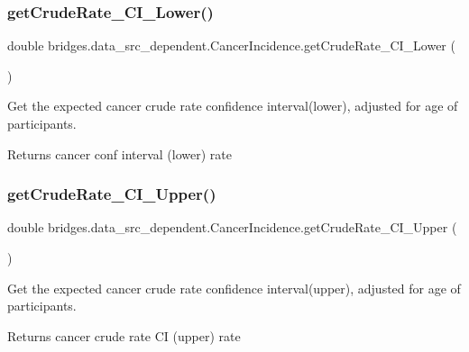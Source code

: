 \subsubsection{\texorpdfstring{getCrudeRate\_CI\_Lower()}{getCrudeRate\_CI\_Lower()}}
{\footnotesize\ttfamily double bridges.\+data\+\_\+src\+\_\+dependent.\+Cancer\+Incidence.\+get\+Crude\+Rate\+\_\+\+C\+I\+\_\+\+Lower (\begin{DoxyParamCaption}{ }\end{DoxyParamCaption})}



Get the expected cancer crude rate confidence interval(lower), adjusted for age of participants. 

\begin{DoxyReturn}{Returns}
cancer conf interval (lower) rate 
\end{DoxyReturn}
\mbox{\label{classbridges_1_1data__src__dependent_1_1_cancer_incidence_a4ca1ceed275ab6371f861d3a03975f15}} 
\subsubsection{\texorpdfstring{getCrudeRate\_CI\_Upper()}{getCrudeRate\_CI\_Upper()}}
{\footnotesize\ttfamily double bridges.\+data\+\_\+src\+\_\+dependent.\+Cancer\+Incidence.\+get\+Crude\+Rate\+\_\+\+C\+I\+\_\+\+Upper (\begin{DoxyParamCaption}{ }\end{DoxyParamCaption})}

Get the expected cancer crude rate confidence interval(upper), adjusted for age of participants.

\begin{DoxyReturn}{Returns}
cancer crude rate CI (upper) rate 
\end{DoxyReturn}
\mbox{\label{classbridges_1_1data__src__dependent_1_1_cancer_incidence_a844c6c3317bdb6b124f32b40804e1ff7}} 
